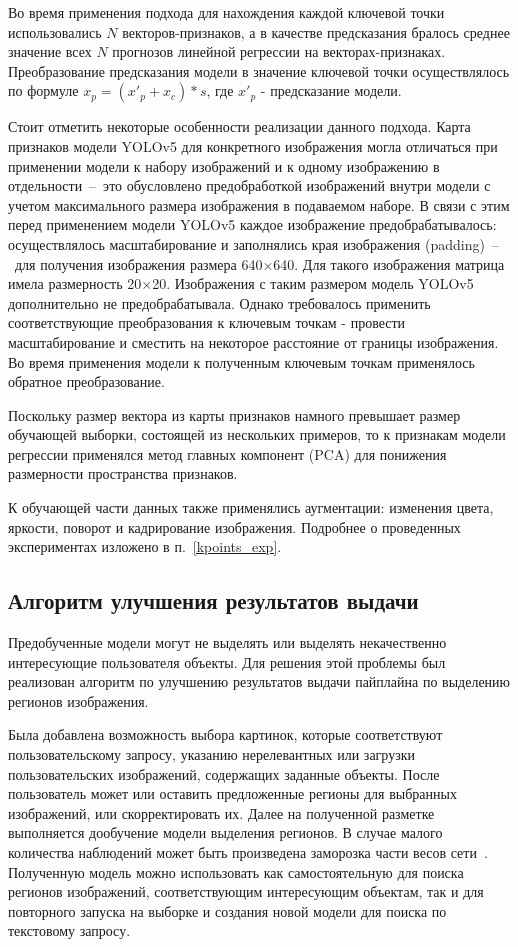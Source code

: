 \documentclass[a4paper,14pt]{article}
\begin{document}
    Во время применения подхода для нахождения каждой ключевой точки использовались $N$ векторов-признаков, а в качестве предсказания бралось среднее значение всех $N$ прогнозов линейной регрессии на векторах-признаках.
    Преобразование предсказания модели в значение ключевой точки осуществлялось по формуле $x_p = (x'_p + x_c) * s$, где $x'_p$ - предсказание модели.

    Стоит отметить некоторые особенности реализации данного подхода.
    Карта признаков модели YOLOv5 для конкретного изображения могла отличаться при применении модели к набору изображений и к одному изображению в отдельности~--~это обусловлено предобработкой изображений внутри модели с учетом максимального размера изображения в подаваемом наборе.
    В связи с этим перед применением модели YOLOv5 каждое изображение предобрабатывалось: осуществлялось масштабирование и заполнялись края изображения (padding)~--~для получения изображения размера 640×640.
    Для такого изображения матрица имела размерность 20×20.
    Изображения с таким размером модель YOLOv5 дополнительно не предобрабатывала.
    Однако требовалось применить соответствующие преобразования к ключевым точкам - провести масштабирование и сместить на некоторое расстояние от границы изображения.
    Во время применения модели к полученным ключевым точкам применялось обратное преобразование.

    Поскольку размер вектора из карты признаков намного превышает размер обучающей выборки, состоящей из нескольких примеров, то к признакам модели регрессии применялся метод главных компонент (PCA) для понижения размерности пространства признаков.

    К обучающей части данных также применялись аугментации: изменения цвета, яркости, поворот и кадрирование изображения. Подробнее о проведенных экспериментах изложено в п.~\ref{kpoints_exp}.

    \subsection{Алгоритм улучшения результатов выдачи}

    Предобученные модели могут не выделять или выделять некачественно интересующие пользователя объекты.
    Для решения этой проблемы был реализован алгоритм по улучшению результатов выдачи пайплайна по выделению регионов изображения.

    Была добавлена возможность выбора картинок, которые соответствуют пользовательскому запросу, указанию нерелевантных или загрузки пользовательских изображений, содержащих заданные объекты.
    После пользователь может или оставить предложенные регионы для выбранных изображений, или скорректировать их.
    Далее на полученной разметке выполняется дообучение модели выделения регионов.
    В случае малого количества наблюдений может быть произведена заморозка части весов сети~\cite{wang2020few}.
    Полученную модель можно использовать как самостоятельную для поиска регионов изображений, соответствующим интересующим объектам, так и для повторного запуска на выборке и создания новой модели для поиска по текстовому запросу.
\end{document}
